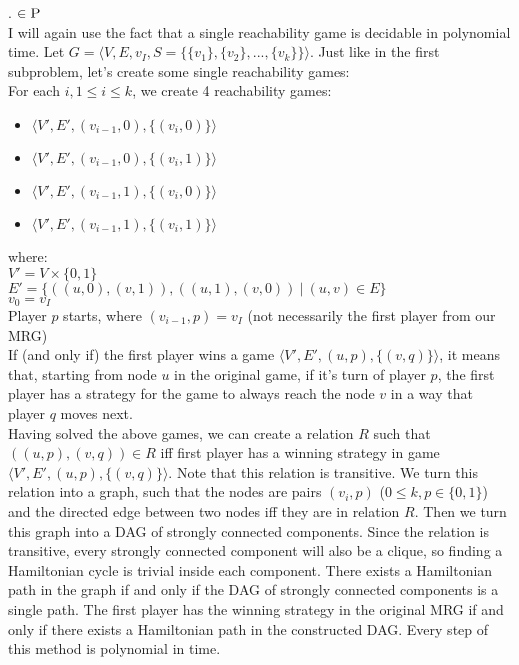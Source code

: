 . \underline{$\in \textsc{P}$}\\
I will again use the fact that a single reachability game is decidable in polynomial time.
Let $G = \langle V, E, v_I, S = \{ \{v_1\}, \{v_2\}, ..., \{v_k\} \}\rangle$. Just like in the first
subproblem, let's create some single reachability games:\\
For each $i, 1 \leq i \leq k$, we create 4 reachability games:
\begin{itemize}
      \item $\langle V', E', (v_{i-1}, 0), \{ (v_i, 0) \} \rangle$
      \item $\langle V', E', (v_{i-1}, 0), \{ (v_i, 1) \} \rangle$
      \item $\langle V', E', (v_{i-1}, 1), \{ (v_i, 0) \} \rangle$
      \item $\langle V', E', (v_{i-1}, 1), \{ (v_i, 1) \} \rangle$
\end{itemize}
where:\\
$V' = V \times \{0,1\}$\\
$E' = \{ ((u,0), (v,1)), ((u,1),(v,0)) \ |\ (u, v) \in E \}$\\
$v_0 = v_I$\\
Player $p$ starts, where $(v_{i-1}, p) = v_I$ (not necessarily the first player from our MRG)\\

\noindent
If (and only if) the first player wins a game $\langle V', E', (u, p), \{ (v, q) \} \rangle$, it means that,
starting from node $u$ in the original game, if it's turn of player $p$, the first player has a strategy
for the game to always reach the node $v$ in a way that player $q$ moves next.\\
Having solved the above games, we can create a relation $R$ such that $((u, p), (v, q)) \in R$ iff
first player has a winning strategy in game $\langle V', E', (u, p), \{ (v, q) \} \rangle$.
Note that this relation is transitive. We turn this relation into a graph, such that the nodes
are pairs $(v_i, p)$ ($0 \leq k, p \in \{0, 1\}$) and the directed edge between two nodes iff they
are in relation $R$. Then we turn this graph into a DAG of strongly connected components.
Since the relation is transitive, every strongly connected component will also be a clique, so finding
a Hamiltonian cycle is trivial inside each component. There exists a Hamiltonian path in the graph if and only if
the DAG of strongly connected components is a single path. The first player has the winning strategy in the
original MRG if and only if there exists a Hamiltonian path in the constructed DAG.
Every step of this method is polynomial in time.\\

